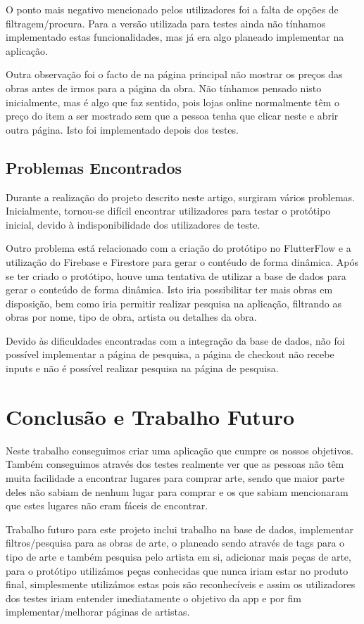\documentclass[conference]{IEEEtran}
\begin{document}
O ponto mais negativo mencionado pelos utilizadores foi a falta de opções de filtragem/procura. 
Para a versão utilizada para testes ainda não tínhamos implementado estas funcionalidades, 
mas já era algo planeado implementar na aplicação.

Outra observação foi o facto de na página principal não mostrar os preços das obras 
antes de irmos para a página da obra. Não tínhamos pensado nisto inicialmente, 
mas é algo que faz sentido, pois lojas online normalmente têm o preço do item a ser 
mostrado sem que a pessoa tenha que clicar neste e abrir outra página. 
Isto foi implementado depois dos testes.

\subsection{Problemas Encontrados}

Durante a realização do projeto descrito neste artigo, surgiram vários problemas. Inicialmente, tornou-se difícil 
encontrar utilizadores para testar o protótipo inicial, devido à indisponibilidade dos utilizadores de teste. 

Outro problema está relacionado com a criação do protótipo no FlutterFlow 
e a utilização do Firebase e Firestore para gerar o contéudo de forma dinâmica. 
Após se ter criado o protótipo, houve uma tentativa de utilizar a base de dados para 
gerar o conteúdo de forma dinâmica. Isto iria possibilitar ter mais obras em disposição, 
bem como iria permitir realizar pesquisa na aplicação, filtrando as obras por nome, 
tipo de obra, artista ou detalhes da obra.

Devido às dificuldades encontradas com a integração da base de dados, 
não foi possível implementar a página de pesquisa, a página de checkout não 
recebe inputs e não é possível realizar pesquisa na página de pesquisa.


\section{Conclusão e Trabalho Futuro}

Neste trabalho conseguimos criar uma aplicação que cumpre os nossos objetivos. Também conseguimos através dos testes realmente ver que as pessoas não têm muita facilidade a encontrar lugares para comprar arte, sendo que maior parte deles não sabiam de nenhum lugar para comprar e os que sabiam mencionaram que estes lugares não eram fáceis de encontrar.

Trabalho futuro para este projeto inclui trabalho na base de dados, implementar filtros/pesquisa para as obras de arte, o planeado sendo através de tags para o tipo de arte e também pesquisa pelo artista em si, adicionar mais peças de arte, para o protótipo utilizámos peças conhecidas que nunca iriam estar no produto final, simplesmente utilizámos estas pois são reconhecíveis e assim os utilizadores dos testes iriam entender imediatamente o objetivo da app e por fim implementar/melhorar páginas de artistas.
\end{document}
